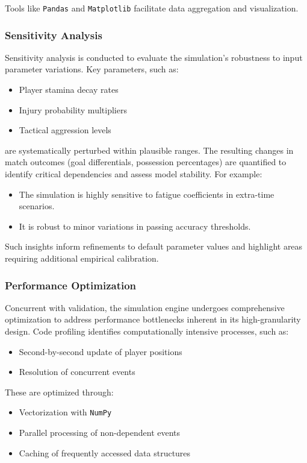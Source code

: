 \documentclass[12pt]{article}
\begin{document}
Tools like \texttt{Pandas} and \texttt{Matplotlib} facilitate data aggregation and visualization.

\subsubsection{Sensitivity Analysis}
Sensitivity analysis is conducted to evaluate the simulation's robustness to input parameter variations. Key parameters, such as:
\begin{itemize}
    \item Player stamina decay rates
    \item Injury probability multipliers
    \item Tactical aggression levels
\end{itemize}

are systematically perturbed within plausible ranges. The resulting changes in match outcomes (goal differentials, possession percentages) are quantified to identify critical dependencies and assess model stability. For example:
\begin{itemize}
    \item The simulation is highly sensitive to fatigue coefficients in extra-time scenarios.
    \item It is robust to minor variations in passing accuracy thresholds.
\end{itemize}

Such insights inform refinements to default parameter values and highlight areas requiring additional empirical calibration.

\subsubsection{Performance Optimization}
Concurrent with validation, the simulation engine undergoes comprehensive optimization to address performance bottlenecks inherent in its high-granularity design. Code profiling identifies computationally intensive processes, such as:
\begin{itemize}
    \item Second-by-second update of player positions
    \item Resolution of concurrent events
\end{itemize}

These are optimized through:
\begin{itemize}
    \item Vectorization with \texttt{NumPy}
    \item Parallel processing of non-dependent events
    \item Caching of frequently accessed data structures
\end{itemize}
\end{document}
